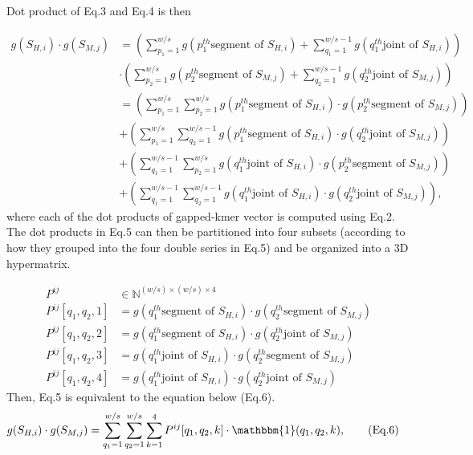 \documentclass[english]{article}
\begin{document}
Dot product of Eq.3 and Eq.4 is then  

\begin{align*}
    g(S_{H,i})\cdot g(S_{M,j}) &=(\sum_{p_1=1}^{w/s}g(p_1^{th} \text{segment of $S_{H,i}$}) + \sum_{q_1=1}^{w/s-1}g(q_1^{th} \text{joint of $S_{H,i}$})) \\
    &\cdot (\sum_{p_2=1}^{w/s} g(p_2
    ^{th} \text{segment of $S_{M,j}$}) + \sum_{q_2=1}^{w/s-1}g(q_2^{th} \text{joint of $S_{M,j}$}))  \\
    &=(\sum_{p_1=1}^{w/s}\sum_{p_2=1}^{w/s} g(p_1^{th} \text{segment of $S_{H,i}$}) \cdot g(p_2^{th} \text{segment of $S_{M,j}$}))\\
    &+(\sum_{p_1=1}^{w/s}\sum_{q_2=1}^{w/s-1} g(p_1^{th} \text{segment of $S_{H,i}$}) \cdot g(q_2^{th} \text{joint of $S_{M,j}$}))\\
    &+(\sum_{q_1=1}^{w/s-1}\sum_{p_2=1}^{w/s} g(q_1^{th} \text{joint of $S_{H,i}$}) \cdot g(p_2^{th} \text{segment of $S_{M,j}$}))\\
    &+(\sum_{q_1=1}^{w/s-1}\sum_{q_2=1}^{w/s-1} g(q_1^{th} \text{joint of $S_{H,i}$}) \cdot g(q_2^{th} \text{joint of $S_{M,j}$})) , \tag{Eq.5}
\end{align*}
 where each of the dot products of gapped-kmer vector is computed using Eq.2. The dot products in Eq.5 can then be partitioned into four subsets (according to how they grouped into the four double series in Eq.5) and be organized into a 3D hypermatrix.\newline

\begin{align*}
    P^{ij} &\in \mathbb{N}^{(w/s)\times (w/s)\times 4} \\
    P^{ij}[q_1,q_2,1] &=  g(q_1^{th} \text{segment of $S_{H,i}$}) \cdot g(q_2^{th} \text{segment of $S_{M,j}$}) \\
    P^{ij}[q_1,q_2,2] &= 
                g(q_1^{th} \text{segment of $S_{H,i}$}) \cdot g(q_2^{th} \text{joint of $S_{M,j}$})\\
    P^{ij}[q_1,q_2,3] &= 
                g(q_1^{th} \text{joint of $S_{H,i}$}) \cdot g(q_2^{th} \text{segment of $S_{M,j}$}) \\
    P^{ij}[q_1,q_2,4] &= 
                g(q_1^{th} \text{joint of $S_{H,i}$}) \cdot g(q_2^{th} \text{joint of $S_{M,j}$})  
\end{align*}
Then, Eq.5 is equivalent to the equation below (Eq.6).
\begin{align*}
g(S_{H,i})\cdot g(S_{M,j}) &= \sum_{q_1=1}^{w/s}\sum_{q_2=1}^{w/s} \sum_{k=1}^4 P^{ij}[q_1,q_2,k]\cdot \mathbbm{1}(q_1,q_2,k), \tag{Eq.6}
\end{align*}
\end{document}
